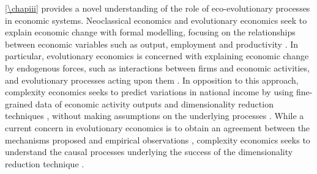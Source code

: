 % 
\cref{\chapiii} provides a novel understanding of the role of eco-evolutionary processes in economic systems. %
% 
% 
Neoclassical economics and evolutionary economics seek to explain economic change with formal modelling, focusing on the relationships between economic variables such as output, employment and productivity \citep{Boschma2005a}.
% 
% 
In particular, evolutionary economics is concerned with explaining economic change by endogenous forces, such as interactions between firms and economic activities, and evolutionary processes acting upon them \citep{Hodgson2019,Metcalfe2006}.
% 
% 
In opposition to this approach, complexity economics \citep{Hidalgo2021} seeks to predict variations in national income by using fine-grained data of economic activity outputs and dimensionality reduction techniques \citep{Mitchell}, without making assumptions on the underlying processes \citep{Hidalgo}. 
% 
%
While a current concern in evolutionary economics is to obtain an agreement between the mechanisms proposed and empirical observations \xxx, complexity economics seeks to understand the causal processes underlying the success of the dimensionality reduction technique \xxx.

